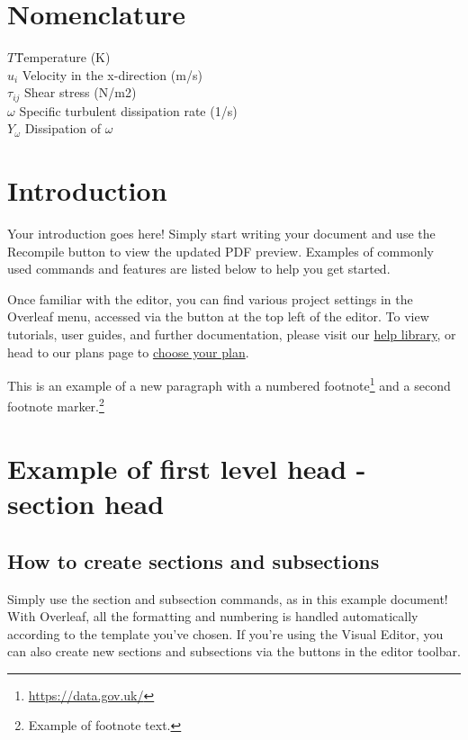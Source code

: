 \documentclass[12pt,a4paper]{article}
\begin{document}
\section*{Nomenclature}

\begin{tabbing}
$T$\qquad \= Temperature (K)\\
$u_i$ \> Velocity in the x-direction (m/s)\\
$\tau_{ij}$ \> Shear stress (N/m2)\\
$\omega$ \> Specific turbulent dissipation rate (1/s)\\
$Y_\omega$ \> Dissipation of $\omega$
\end{tabbing}



\section{Introduction}

Your introduction goes here! Simply start writing your document and use the Recompile button to view the updated PDF preview. Examples of commonly used commands and features are listed below to help you get started.
\lipsum[2]

Once familiar with the editor, you can find various project settings in the Overleaf menu, accessed via the button at the top left of the editor. To view tutorials, user guides, and further documentation, please visit our \href{https://www.overleaf.com/learn}{help library}, or head to our plans page to \href{https://www.overleaf.com/user/subscription/plans}{choose your plan}. 

This is an example of a new paragraph with a numbered footnote\footnote{\url{https://data.gov.uk/}} and a second footnote marker.\footnote{Example of footnote text.}


\section{Example of first level head - section head}\label{sec2}

\lipsum[4]

\lipsum[4]


\subsection{How to create sections and subsections}
Simply use the section and subsection commands, as in this example document! With Overleaf, all the formatting and numbering is handled automatically according to the template you've chosen. If you're using the Visual Editor, you can also create new sections and subsections via the buttons in the editor toolbar.
\end{document}
